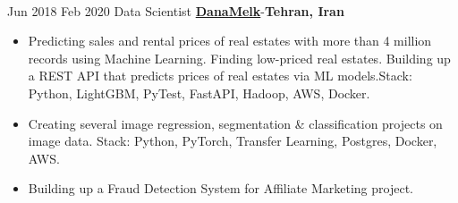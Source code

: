 \documentclass[letterpaper]{DS_class_file} %
\begin{document}
\begin{twenty}
{\begin{itemize}
                
		\end{itemize}}
		\\
	\twentyitem
		{Jun 2018}
		{Feb 2020}
		{\hspace{0.3cm}Data Scientist}
		{\href{https://www.linkedin.com/company/danamelk/people/}{\textbf{DanaMelk}}-\textbf{Tehran, Iran}}
		{}
		{\begin{itemize}
            \item Predicting sales and rental prices of real estates with more than 4 million records using Machine Learning. Finding low-priced real estates. Building up a REST API that predicts prices of real estates via ML models.\newline Stack: Python, LightGBM, PyTest, FastAPI, Hadoop, AWS, Docker.
			\item Creating several image regression, segmentation \& classification projects on image data. \newline Stack: Python, PyTorch, Transfer Learning, Postgres, Docker, AWS.
                \item Building up a Fraud Detection System for Affiliate Marketing project.
      


\end{itemize}}
\end{twenty}
\end{document}
